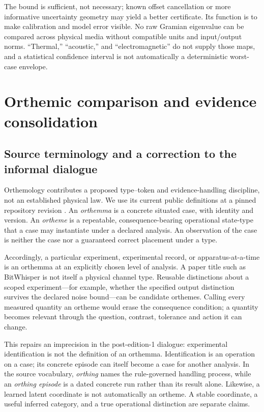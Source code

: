\documentclass[11pt,a4paper]{article}
\theoremstyle{definition}
\theoremstyle{remark}
\begin{document}
The bound is sufficient, not necessary; known offset cancellation or more informative uncertainty geometry may yield a better certificate. Its function is to make calibration and model error visible. No raw Gramian eigenvalue can be compared across physical media without compatible units and input/output norms. ``Thermal,'' ``acoustic,'' and ``electromagnetic'' do not supply those maps, and a statistical confidence interval is not automatically a deterministic worst-case envelope.


\section{Orthemic comparison and evidence consolidation}\label{sec:orthemic}
\subsection{Source terminology and a correction to the informal dialogue}
Orthemology contributes a proposed type--token and evidence-handling discipline, not an established physical law. We use its current public definitions at a pinned repository revision \citep{orthemology}. An \emph{orthemma} is a concrete situated case, with identity and version. An \emph{ortheme} is a repeatable, consequence-bearing operational state-type that a case may instantiate under a declared analysis. An observation of the case is neither the case nor a guaranteed correct placement under a type.

Accordingly, a particular experiment, experimental record, or apparatus-at-a-time is an orthemma at an explicitly chosen level of analysis. A paper title such as BitWhisper is not itself a physical channel type. Reusable distinctions about a scoped experiment---for example, whether the specified output distinction survives the declared noise bound---can be candidate orthemes. Calling every measured quantity an ortheme would erase the consequence condition; a quantity becomes relevant through the question, contrast, tolerance and action it can change.

This repairs an imprecision in the post-edition-1 dialogue: experimental identification is not the definition of an orthemma. Identification is an operation on a case; its concrete episode can itself become a case for another analysis. In the source vocabulary, \emph{orthing} names the rule-governed handling process, while an \emph{orthing episode} is a dated concrete run rather than its result alone. Likewise, a learned latent coordinate is not automatically an ortheme. A stable coordinate, a useful inferred category, and a true operational distinction are separate claims.
\end{document}
